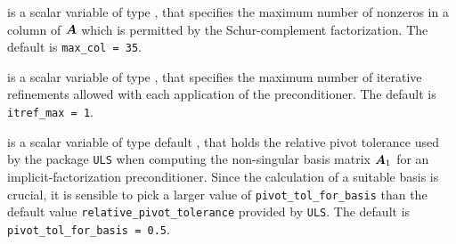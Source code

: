 \documentclass{galahad}
\begin{document}
\begin{description}
 is a scalar variable of type \integer, that specifies
the maximum number of nonzeros in a column of ${\bm{A}}$ which is permitted
by the Schur-complement factorization.
The default is {\tt max\_col = 35}.




 is a scalar variable of type \integer, that specifies
the maximum number of iterative refinements allowed with each application
of the preconditioner.
The default is {\tt itref\_max = 1}.




 is a scalar variable of type default
\realdp, that holds the relative
pivot tolerance used by the package {\tt ULS}
when computing the non-singular basis matrix ${\bm{A}}_1$ for
an implicit-factorization preconditioner. Since the calculation of a
suitable basis is crucial, it is sensible to pick a larger
value of {\tt pivot\_tol\_for\_basis} than
the default value {\tt relative\_pivot\_tolerance} provided by {\tt ULS}.
The default is {\tt pivot\_tol\_for\_basis = 0.5}.



\end{description}
\end{document}
